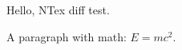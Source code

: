 \documentclass{article}
\begin{document}
Hello, NTex diff test.

A paragraph with math: $E = mc^2$.
\end{document}
